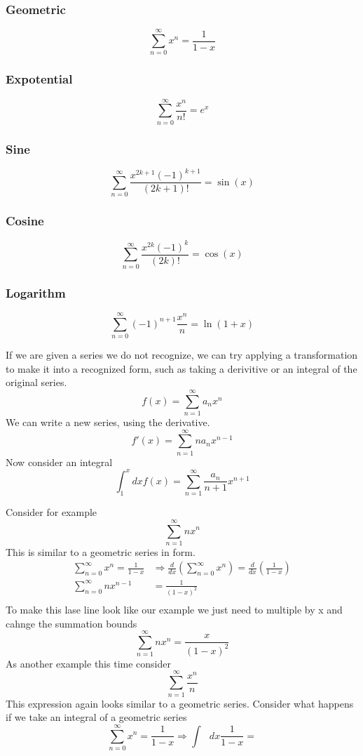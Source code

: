 \documentclass{article}
\newcommand{\be}{\begin{equation}}
\newcommand{\ee}{\end{equation}}
\newcommand{\sums}{\sum_{n=0}^\infty}
\begin{document}
\subsubsection*{Geometric}
\be
\sums x^n = \frac{1}{1-x}
\ee

\subsubsection*{Expotential}
\be
\sums \frac{x^n}{n!} = e^x
\ee

\subsubsection*{Sine}
\be
\sums \frac{x^{2k+1}(-1)^{k+1}}{(2k+1)!} = \sin(x)
\ee

\subsubsection*{Cosine}
\be
\sums \frac{x^{2k}(-1)^k}{(2k)!} = \cos(x)
\ee

\subsubsection*{Logarithm}
\be
\sums (-1)^{n+1} \frac{x^n}{n} = \ln(1+x)
\ee

If we are given a series we do not recognize, we can try applying a transformation to make it into a recognized form, such as taking a derivitive or an integral of the original series. 
\be
f(x) = \sum_{n=1}^\infty a_nx^n
\ee
We can write a new series, using the derivative.
\be
f'(x) = \sum_{n=1}^\infty na_nx^{n-1}
\ee
Now consider an integral
\be
\int_1^x dx f(x) = \sum_{n=1}^\infty \frac{a_n}{n+1}x^{n+1}
\ee

Consider for example
\be
\sum_{n=1}^\infty nx^n
\ee
This is similar to a geometric series in form. 
\be
\begin{split}
	\sums x^n = \frac{1}{1-x} &\Rightarrow \frac{d}{dx} \left( \sums x^n\right) = \frac{d}{dx} \left( \frac{1}{1-x} \right)\\
	\sums nx^{n-1} &= \frac{1}{(1-x)^2} \\
\end{split}
\ee
To make this lase line look like our example we just need to multiple by x and cahnge the summation bounds
\be
\sum_{n=1}^\infty nx^n = \frac{x}{(1-x)^2} 
\ee
As another example this time consider
\be
\sum_{n=1}^\infty \frac{x^n}{n}
\ee
This expression again looks similar to a geometric series.
Consider what happens if we take an integral of a geometric series
\be
\sums x^n = \frac{1}{1-x} \Rightarrow \int \text{ } dx \frac{1}{1-x} = 
\ee
\end{document}
